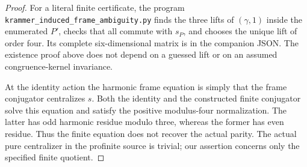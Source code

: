 \begin{proof}
For a literal finite certificate, the program
\texttt{krammer\_induced\_frame\_ambiguity.py}
finds the three lifts of $(\gamma,1)$ inside the
enumerated $P'$, checks that all commute with
$s_P$, and chooses the unique lift of order four.
Its complete six-dimensional matrix is in the
companion JSON. The existence proof above does
not depend on a guessed lift or on an assumed
congruence-kernel invariance.

At the identity action the harmonic frame equation
is simply that the frame conjugator centralizes $s$.
Both the identity and the constructed finite
conjugator solve this equation and satisfy the
positive modulus-four normalization. The latter
has odd harmonic residue modulo three, whereas
the former has even residue. Thus the finite
equation does not recover the actual parity.
The actual pure centralizer in the profinite
source is trivial; our assertion concerns only
the specified finite quotient.
\end{proof}
